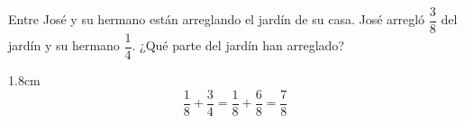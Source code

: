 Entre José y su hermano están arreglando el jardín de su casa. José arregló $\dfrac{3}{8}$ del jardín y su hermano $\dfrac{1}{4}$. ¿Qué parte del jardín han arreglado?
           
            \begin{solutionbox}{1.8cm}
                  \[\dfrac{1}{8}+\dfrac{3}{4}=\dfrac{1}{8}+\dfrac{6}{8}=\dfrac{7}{8}\]
            \end{solutionbox}